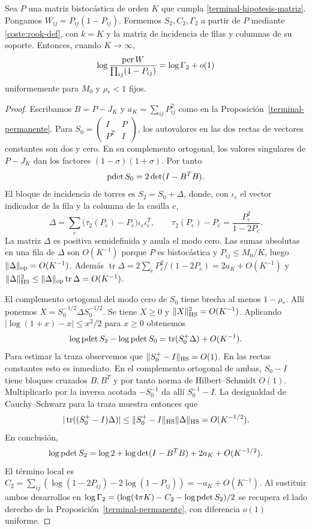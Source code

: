 \begin{lema}\label{terminal-normalizador}
Sea $P$ una matriz bistocástica de orden $K$ que cumpla \eqref{terminal-hipotesis-matriz}.
Pongamos $W_{ij}=P_{ij}(1-P_{ij})$. Formemos $S_2,C_2,\Gamma_2$ a partir de $P$ mediante
\eqref{coste:rook-def}, con $k=K$ y la matriz de incidencia de filas y columnas de su soporte.
Entonces, cuando $K\to\infty$,
\[
 \log\frac{\operatorname{per} W}{\prod_{ij}(1-P_{ij})}=\log\Gamma_2+o(1)
\]
uniformemente para $M_0$ y $\rho_*<1$ fijos.
\end{lema}
\begin{proof}
Escribamos $B=P-J_K$ y $a_K=\sum_{ij}P_{ij}^2$ como en la Proposición~\ref{terminal-permanente}.
Para $S_0=\left(\begin{smallmatrix}I&P\\P^T&I\end{smallmatrix}\right)$, los autovalores en las dos
rectas de vectores constantes son dos y cero. En su complemento ortogonal, los valores singulares de
$P-J_K$ dan los factores $(1-\sigma)(1+\sigma)$. Por tanto
\[
 \operatorname{pdet} S_0=2\det(I-B^TB).
\]
El bloque de incidencia de torres es $S_2=S_0+\Delta$, donde, con $\iota_e$ el vector indicador de la
fila y la
columna de la casilla $e$,
\[
 \Delta=\sum_e\bigl(\tau_2(P_e)-P_e\bigr)\iota_e\iota_e^T,\qquad
 \tau_2(P_e)-P_e=\frac{P_e^2}{1-2P_e}.
\]
La matriz $\Delta$ es positiva semidefinida y anula el modo cero. Las sumas absolutas en una fila de
$\Delta$ son $O(K^{-1})$ porque $P$ es bistocástica y $P_{ij}\le M_0/K$, luego $\|\Delta\|_{\rm
op}=O(K^{-1})$. Además
$\operatorname{tr}\Delta=2\sum_e P_e^2/(1-2P_e)=2a_K+O(K^{-1})$ y
$\|\Delta\|_{\rm HS}^2\le\|\Delta\|_{\rm op}\operatorname{tr}\Delta=O(K^{-1})$.

El complemento ortogonal del modo cero de $S_0$ tiene brecha al menos $1-\rho_*$. Allí ponemos
$X=S_0^{-1/2}\Delta S_0^{-1/2}$. Se tiene $X\ge0$ y $\|X\|_{\rm HS}^2=O(K^{-1})$. Aplicando
$|\log(1+x)-x|\le x^2/2$ para $x\ge0$ obtenemos
\[
 \log\operatorname{pdet} S_2-\log\operatorname{pdet} S_0
 =\operatorname{tr}(S_0^+\Delta)+O(K^{-1}).
\]
Para estimar la traza observemos que $\|S_0^+-I\|_{\rm HS}=O(1)$. En las rectas constantes esto es
inmediato. En el complemento ortogonal de ambas, $S_0-I$ tiene bloques cruzados $B,B^T$ y por tanto norma de
Hilbert--Schmidt $O(1)$. Multiplicarlo por la inversa acotada $-S_0^{-1}$ da allí $S_0^{-1}-I$. La
desigualdad de Cauchy--Schwarz para la traza muestra entonces que
\[
 |\operatorname{tr}((S_0^+-I)\Delta)|\le
 \|S_0^+-I\|_{\rm HS}\|\Delta\|_{\rm HS}=O(K^{-1/2}).
\]
En conclusión,
\[
 \log\operatorname{pdet} S_2=\log 2+\log\det(I-B^TB)+2a_K+O(K^{-1/2}).
\]
El término local es
$C_2=\sum_{ij}(\log(1-2P_{ij})-2\log(1-P_{ij}))=-a_K+O(K^{-1})$.
Al sustituir ambos desarrollos en
$\log\Gamma_2=(\log(4\pi K)-C_2-\log\operatorname{pdet} S_2)/2$
se recupera el lado derecho de la Proposición~\ref{terminal-permanente}, con diferencia $o(1)$
uniforme.
\end{proof}
